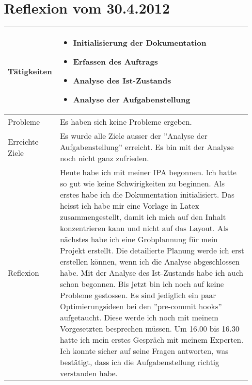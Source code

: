 
\begin{table}
\section{Reflexion vom 30.4.2012}
\begin{tabular}{| l | p{12cm} |}
    \hline
    Tätigkeiten &
    \begin{itemize}
        \item Initialisierung der Dokumentation 
        \item Erfassen des Auftrags
        \item Analyse des Ist-Zustands
        \item Analyse der Aufgabenstellung
    \end{itemize}  \\
    \hline
    Probleme &
    Es haben sich keine Probleme ergeben. \\
    \hline
    Erreichte Ziele &
    Es wurde alle Ziele ausser der ''Analyse der Aufgabenstellung'' erreicht. Es bin mit der Analyse noch nicht ganz zufrieden. \\
    \hline
    Reflexion &
    Heute habe ich mit meiner IPA begonnen. Ich hatte so gut wie keine Schwirigkeiten zu beginnen. 
    Als erstes habe ich die Dokumentation initialisiert. Das heisst ich habe mir eine Vorlage in Latex zusammengestellt, damit ich mich auf den Inhalt konzentrieren kann und nicht auf das Layout.
    Als nächstes habe ich eine Grobplannung für mein Projekt erstellt. Die detailierte Planung werde ich erst erstellen können, wenn ich die Analyse abgeschlossen habe.
    Mit der Analyse des Ist-Zustands habe ich auch schon begonnen. Bis jetzt bin ich noch auf keine Probleme gestossen. Es sind jediglich ein paar Optimierungsideen bei den ''pre-commit hooks'' aufgetaucht. Diese werde ich noch mit meinem Vorgesetzten besprechen müssen.  
    Um 16.00 bis 16.30 hatte ich mein erstes Gespräch mit meinem Experten. Ich konnte sicher auf seine Fragen antworten, was bestätigt, dass ich die Aufgabenstellung richtig verstanden habe. \\
    \hline
\end{tabular}
\end{table}
\clearpage

